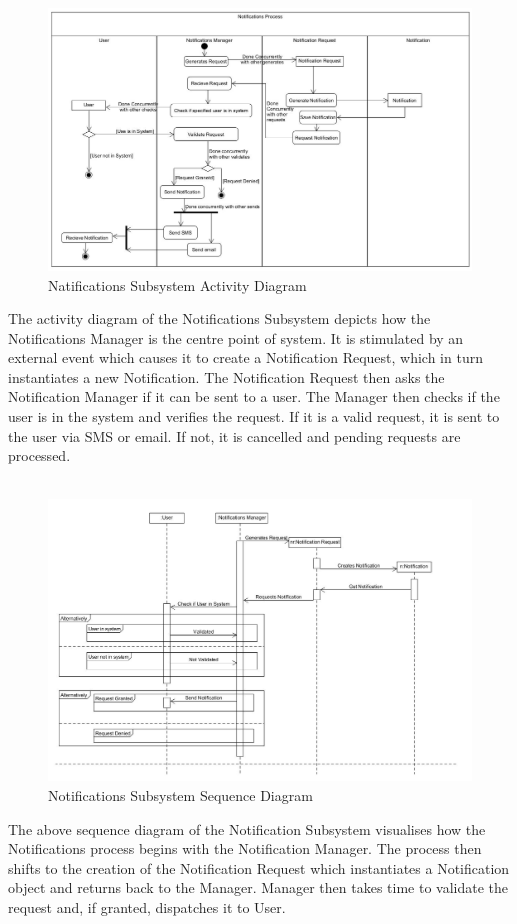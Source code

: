 \documentclass{article}
\begin{document}
				\begin{figure}[h!]
					\includegraphics[scale=0.5]{Diagrams/Activity_Diagram_Notifications.JPG}
					\caption{Natifications Subsystem Activity Diagram}	
				\end{figure}
				{The activity diagram of the Notifications Subsystem depicts how the Notifications Manager is the centre point of system. It is stimulated by an external event which causes it to create a Notification Request, which in turn instantiates a new Notification. The Notification Request then asks the Notification Manager if it can be sent to a user. The Manager then checks if the user is in the system and verifies the request. If it is a valid request, it is sent to the user via SMS or email. If not, it is cancelled and pending requests are processed.\\\\}
				
				\begin{figure}[h!]
					\includegraphics[scale=0.5]{Diagrams/Sequence_Diagram_Notifications.JPG}
					\caption{Notifications Subsystem Sequence Diagram}	
				\end{figure}
				{The above sequence diagram of the Notification Subsystem visualises how the Notifications process begins with the Notification Manager. The process then shifts to the creation of the Notification Request which instantiates a Notification object and returns back to the Manager. Manager then takes time to validate the request and, if granted, dispatches it to User.\\\\}
				
\end{document}
